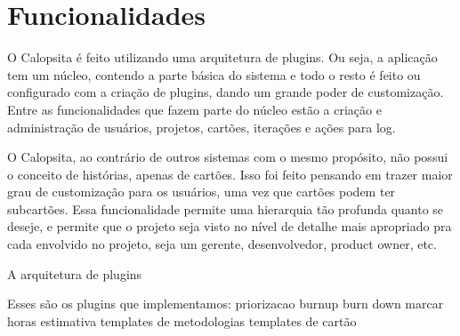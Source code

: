 \section{Funcionalidades}

O Calopsita é feito utilizando uma arquitetura de plugins. Ou seja, a aplicação tem um núcleo, contendo a parte básica do sistema e todo o resto é feito ou configurado com a criação de plugins, dando um grande poder de customização.
Entre as funcionalidades que fazem parte do núcleo estão a criação e administração de usuários,
projetos, cartões, iterações e ações para log.

O Calopsita, ao contrário de outros sistemas com o mesmo propósito, não possui o conceito de histórias, apenas de cartões. Isso foi feito pensando em trazer maior grau de customização para os usuários, uma vez que cartões podem ter subcartões. Essa funcionalidade permite uma hierarquia tão profunda quanto se deseje, e permite que o projeto seja visto no nível de detalhe mais apropriado pra cada envolvido no projeto, seja um gerente, desenvolvedor, product owner, etc.

A arquitetura de plugins

Esses são os plugins que implementamos:
priorizacao
burnup
burn down
marcar horas
estimativa
templates de metodologias
templates de cartão


